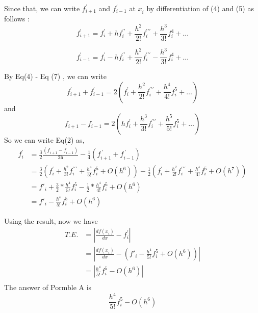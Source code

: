 \documentclass{report}
\begin{document}
Since that, we can write $f^{\prime}_{i+1}$ and $f^{\prime}_{i-1}$ at $x^{}_{i}$ by differentiation of (4) and (5) as follows :\\

\begin{equation}
f^{\prime}_{i+1}=f^{\prime}_{i} + hf^{\prime\prime}_{i} + \frac{h^{2}}{2!}f^{\prime\prime\prime}_{i} + \frac{h^{3}}{3!}f^{4}_{i}+ \dots 
\end{equation}

\begin{equation} 
f^{\prime}_{i-1} =f^{\prime}_{i} - hf^{\prime\prime}_{i} + \frac{h^{2}}{2!}f^{\prime\prime\prime}_{i} - \frac{h^{3}}{3!}f^{4}_{i}+ \dots 
\end{equation} 

By Eq(4) - Eq (7) , we can write
\begin{displaymath} 
f^{\prime}_{i+1} + f^{\prime}_{i-1}= 2(f^{\prime}_{i}+\frac{h^2}{2!}f^{\prime\prime\prime}_{i}+\frac{h^4}{4!}f^{5}_{i}+ \dots)
\end{displaymath} 
and
\begin{displaymath} 
f^{}_{i+1} - f^{}_{i-1} = 2(hf^{\prime}_{i}+ \frac{h^3}{3!}f^{\prime\prime\prime}_{i}+ \frac{h^5}{5!}f^{5}_{i} +\dots)
\end{displaymath} 
So we can write Eq(2) as,
\begin{align*}
f^{\prime}_{i} & = \frac{3}{2}\frac{(\textit{f}^{}_{i+1}-\textit{f}^{}_{i-1})}{2\textit{h}} - \frac{1}{4}(\textit{f}^{\ \prime}_{i+1}+\textit{f}^{\  \prime}_{i-1}) \\
& =\frac{3}{2} (f^{\prime}_{i}+ \frac{h^2}{3!}f^{\prime\prime\prime}_{i}+ \frac{h^4}{5!}f^{5}_{i} +O(h^6))-\frac{1}{2}(f^{\prime}_{i}+\frac{h^2}{2!}f^{\prime\prime\prime}_{i}+\frac{h^4}{4!}f^{5}_{i}+O(h^7))\\
&=f'_{i} +\frac{3}{2}*\frac{h^4}{5!}f^{5}_{i} - \frac{1}{2}*\frac{h^4}{4!}f^{5}_{i}+O(h^6)\\
&=f'_{i}- \frac{h^4}{5!}f^{5}_{i}+O(h^6)
\end{align*}

\newpage

Using the result, now we have 
\begin{align*}
\textit{T.E.}  & =\left \vert \frac{df(x^{}_{i})}{dx} -f^{ \prime}_{i}\right\vert\\
&=\left\vert \frac{df(x^{}_{i})}{dx} -(f'_{i}- \frac{h^4}{5!}f^{5}_{i}+O(h^6)) \right\vert\\
&=\left\vert \frac{h^4}{5!}f^{5}_{i} - O(h^6) \right\vert\\
\end{align*}
The answer of Pormble A is
\[
 \frac{h^4}{5!}f^{5}_{i} - O(h^6)
\]
\newpage
\end{document}
